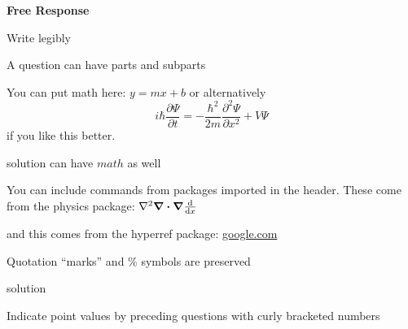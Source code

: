 \documentclass{exam}
\begin{document}
\newpage
\par\noindent \textbf{\large  Free Response}
\par\noindent  Write legibly
\begin{questions}
\setcounter{question}{27}
\question A question can have parts and subparts
\question You can put math here: $y=mx+b$ or alternatively \[i\hbar \frac{\partial \Psi}{\partial t} = -\frac{\hbar^2}{2m}\frac{\partial^2 \Psi}{\partial x^2} + V \Psi\] if you like this better.
	\begin{solution}[20 pt]
	solution can have $math$ as well
	\end{solution}
\question You can include commands from packages imported in the header. These come from the physics package: $\laplacian\div\grad\dv{x}$
	\begin{solution}[20 pt]
	and this comes from the hyperref package: \url{google.com}
	\end{solution}
\question Quotation ``marks'' and \% symbols are preserved
	\begin{solution}[20 pt]
	solution
	\end{solution}
\question[3]  Indicate point values by preceding questions with curly bracketed numbers
	\begin{parts}

\end{parts}
\end{questions}
\end{document}
